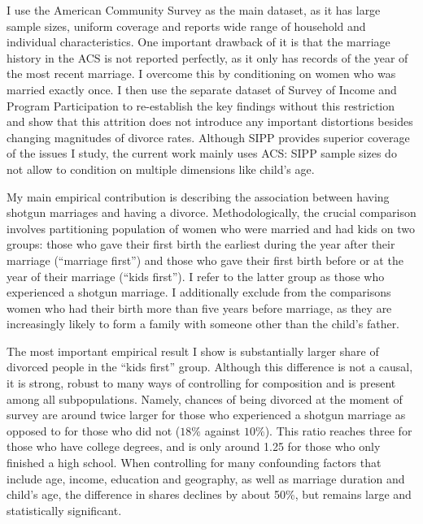 \documentclass[12pt,letter]{article}
\begin{document}
I use the American Community Survey as the main dataset, as it has large sample sizes, uniform coverage and reports wide range of household and individual characteristics. One important drawback of it is that the marriage history in the ACS is not reported perfectly, as it only has records of the year of the most recent marriage. I overcome this by conditioning on women who was married exactly once. I then use the separate dataset of Survey of Income and Program Participation to re-establish the key findings without this restriction and show that this attrition does not introduce any important distortions besides changing magnitudes of divorce rates. Although SIPP provides superior coverage of the issues I study, the current work mainly uses ACS: SIPP sample sizes do not allow to condition on multiple dimensions like child's age. 

My main empirical contribution is describing the association between having shotgun marriages and having a divorce. Methodologically, the crucial comparison involves partitioning population of women who were married and had kids on two groups:  those who gave their first birth the earliest during the year after their marriage (``marriage first'') and those who gave their first birth before or at the year of their marriage (``kids first''). I refer to the latter group as those who experienced a shotgun marriage. I additionally exclude from the comparisons women who had their birth more than five years before marriage, as they are increasingly likely to form a family with someone other than the child's father. 

The most important empirical result I show is substantially larger share of divorced people in the ``kids first'' group. Although this difference is not a causal, it is strong, robust to many ways of controlling for composition and is present among all subpopulations. Namely, chances of being divorced at the moment of survey are around twice larger for those who experienced a shotgun marriage as opposed to for those who did not ($18\%$ against $10\%$). This ratio reaches three for those who have college degrees, and is only around 1.25 for those who only finished a high school. When controlling for many confounding factors that include age, income, education and geography, as well as marriage duration and child's age, the difference in shares declines by about 50\%, but remains large and statistically significant.  %
\end{document}
